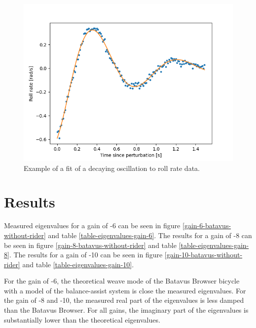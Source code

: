 \documentclass[12pt]{article}
\begin{document}
\begin{figure}[h]
    \centering
    \includegraphics[width=\columnwidth]{figures/example_roll_rate_fit.png}
    \caption{Example of a fit of a decaying oscillation to roll rate data.}
    \label{example-roll-rate-fit}
\end{figure}


\section{Results}
Measured eigenvalues for a gain of -6 can be seen in figure \ref{gain-6-batavus-without-rider} and table \ref{table-eigenvalues-gain-6}. The results for a gain of -8 can be seen in figure \ref{gain-8-batavus-without-rider} and table \ref{table-eigenvalues-gain-8}. The results for a gain of -10 can be seen in figure \ref{gain-10-batavus-without-rider} and table \ref{table-eigenvalues-gain-10}.

For the gain of -6, the theoretical weave mode of the Batavus Browser bicycle with a model of the balance-assist system is close the measured eigenvalues. For the gain of -8 and -10, the measured real part of the eigenvalues is less damped than the Batavus Browser. For all gains, the imaginary part of the eigenvalues is substantially lower than the theoretical eigenvalues.
\end{document}
